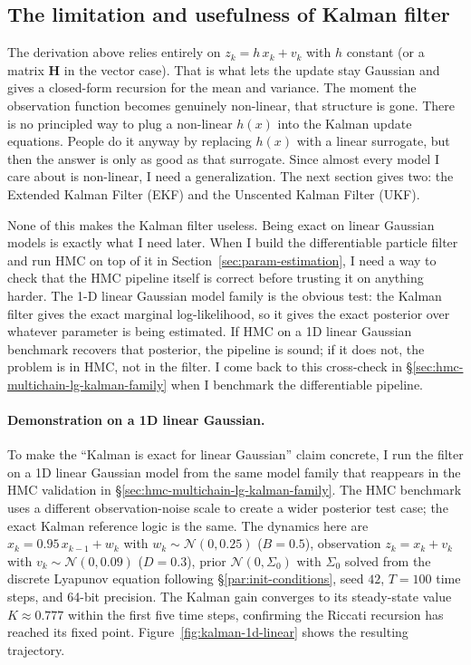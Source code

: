 \documentclass{article}
\begin{document}
\subsection{The limitation and usefulness of Kalman filter}
The derivation above relies entirely on $z_k = h\,x_k + v_k$ with $h$ constant (or a matrix $\mathbf{H}$ in the vector case). That is what lets the update stay Gaussian and gives a closed-form recursion for the mean and variance. The moment the observation function becomes genuinely non-linear, that structure is gone. There is no principled way to plug a non-linear $h(x)$ into the Kalman update equations. People do it anyway by replacing $h(x)$ with a linear surrogate, but then the answer is only as good as that surrogate. Since almost every model I care about is non-linear, I need a generalization. The next section gives two: the Extended Kalman Filter (EKF) and the Unscented Kalman Filter (UKF).

None of this makes the Kalman filter useless. Being exact on linear Gaussian models is exactly what I need later. When I build the differentiable particle filter and run HMC on top of it in Section~\ref{sec:param-estimation}, I need a way to check that the HMC pipeline itself is correct before trusting it on anything harder. The 1-D linear Gaussian model family is the obvious test: the Kalman filter gives the exact marginal log-likelihood, so it gives the exact posterior over whatever parameter is being estimated. If HMC on a 1D linear Gaussian benchmark recovers that posterior, the pipeline is sound; if it does not, the problem is in HMC, not in the filter. I come back to this cross-check in \S\ref{sec:hmc-multichain-lg-kalman-family} when I benchmark the differentiable pipeline.

\paragraph{Demonstration on a 1D linear Gaussian.}
To make the ``Kalman is exact for linear Gaussian'' claim concrete, I run the filter on a 1D linear Gaussian model from the same model family that reappears in the HMC validation in \S\ref{sec:hmc-multichain-lg-kalman-family}. The HMC benchmark uses a different observation-noise scale to create a wider posterior test case; the exact Kalman reference logic is the same. The dynamics here are $x_k = 0.95\,x_{k-1} + w_k$ with $w_k \sim \mathcal{N}(0, 0.25)$ ($B = 0.5$), observation $z_k = x_k + v_k$ with $v_k \sim \mathcal{N}(0, 0.09)$ ($D = 0.3$), prior $\mathcal{N}(0, \Sigma_0)$ with $\Sigma_0$ solved from the discrete Lyapunov equation following \S\ref{par:init-conditions}, seed $42$, $T = 100$ time steps, and 64-bit precision. The Kalman gain converges to its steady-state value $K \approx 0.777$ within the first five time steps, confirming the Riccati recursion has reached its fixed point. Figure~\ref{fig:kalman-1d-linear} shows the resulting trajectory.
\end{document}
